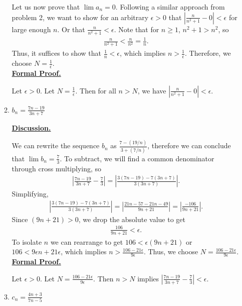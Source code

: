 \documentclass [10pt]{article}
\newcommand{\jg}[1]{{\color{blue} #1}}
\begin{document}
\begin{enumerate}
\begin{enumerate}
{Let us now prove that $\lim a_n = 0$. Following a similar approach from problem 2, we want to show for an arbitrary $\epsilon > 0$ that $|\frac{n}{n^2 + 1} - 0| < \epsilon$ for large enough $n$. Or that $\frac{n}{n^2 + 1} < \epsilon$. Note that for $n \geq 1$, $n^2 + 1 > n^2$, so 
\begin{align*}
    \frac{n}{n^2 + 1} < \frac{n}{n^2} = \frac{1}{n}.
\end{align*}
Thus, it suffices to show that $\frac{1}{n} < \epsilon$, which implies $n > \frac{1}{\epsilon}$. Therefore, we choose $N = \frac{1}{\epsilon}$. \\

\textbf{\underline{Formal Proof.}}

Let $\epsilon > 0$. Let $N = \frac{1}{\epsilon}$. Then for all $n>N$, we have $|\frac{n}{n^2+1} - 0| < \epsilon$.
}
\item $b_n = \frac{7n-19}{3n+7}$

\jg{
\textbf{\underline{Discussion.}}

We can rewrite the sequence $b_n$ as $\frac{7 - (19/n)}{3 + (7/n)}$, therefore we can conclude that $\lim b_n = \frac{7}{3}$. To subtract, we will find a common denominator through cross multiplying, so
\begin{align*}
    \left|\frac{7n - 19}{3n+7} - \frac{7}{3}\right| = \left|\frac{3(7n-19) - 7(3n+7)}{3(3n+7)}\right|.
\end{align*}
Simplifying, 
\begin{align*}
    \left|\frac{3(7n-19) - 7(3n+7)}{3(3n+7)}\right| = \left|\frac{21n - 57 - 21n - 49}{9n + 21}\right| = \left|\frac{-106}{9n+21}\right|. 
\end{align*}
Since $(9n+21) > 0$, we drop the absolute value to get
\begin{align*}
    \frac{106}{9n+21} < \epsilon.
\end{align*}
To isolate $n$ we can rearrange to get $106 < \epsilon (9n+21)$ or $106 < 9\epsilon n + 21\epsilon$, which implies $n > \frac{106 - 21\epsilon}{9\epsilon}$. Thus, we choose $N = \frac{106 - 21\epsilon}{9\epsilon}$. \\

\textbf{\underline{Formal Proof.}}

Let $\epsilon > 0$. Let $N = \frac{106 - 21\epsilon}{9\epsilon}$. Then $n > N$ implies $|\frac{7n-19}{3n+7} - \frac{7}{3}| < \epsilon$. 
 
}

\item $c_n = \frac{4n+3}{7n-5}$


\end{enumerate}
\end{enumerate}
\end{document}
